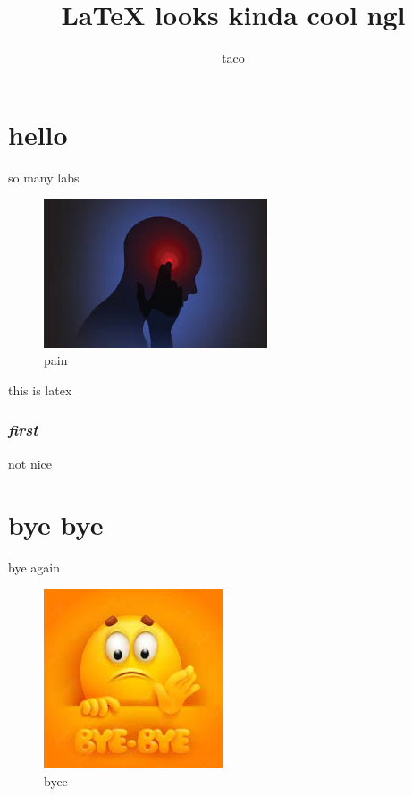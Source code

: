 \documentclass{report}
\begin{document}
    \title{\LaTeX{} looks kinda cool ngl}
    \author{taco}

    \maketitle

    \tableofcontents

    \chapter{hello}
	so many labs
	\begin{figure}[h]
		\includegraphics[width=250px]{pain.png}
		\centering
		\caption{pain}
	\end{figure}
	
	{\selectfont \Large this is latex}
	\subsection{\textsl{first}}
	not nice
	\chapter{bye bye}
	bye again
    \begin{figure}[h]
        \includegraphics[width=200px]{sadbye.png}
        \centering
        \caption{byee}
    \end{figure}
\end{document}
